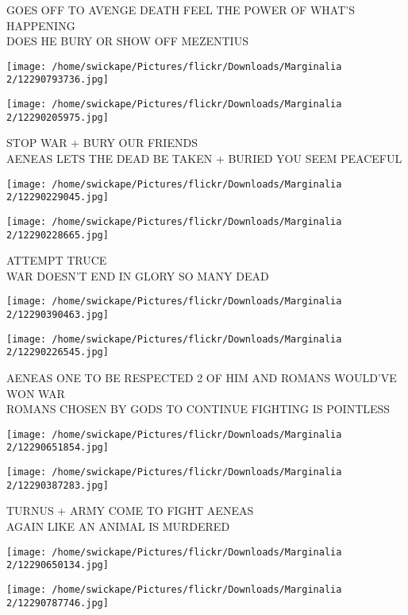 \documentclass[10pt,letterpaper]{article}
\begin{document}
GOES OFF TO AVENGE DEATH FEEL THE POWER OF WHAT'S HAPPENING\\
DOES HE BURY OR SHOW OFF MEZENTIUS
\pagebreak

\texttt{[image: /home/swickape/Pictures/flickr/Downloads/Marginalia 2/12290793736.jpg]}

\vspace{0.25in}
\texttt{[image: /home/swickape/Pictures/flickr/Downloads/Marginalia 2/12290205975.jpg]}

STOP WAR + BURY OUR FRIENDS\\
AENEAS LETS THE DEAD BE TAKEN + BURIED YOU SEEM PEACEFUL
\pagebreak

\texttt{[image: /home/swickape/Pictures/flickr/Downloads/Marginalia 2/12290229045.jpg]}

\vspace{0.25in}
\texttt{[image: /home/swickape/Pictures/flickr/Downloads/Marginalia 2/12290228665.jpg]}

ATTEMPT TRUCE\\
WAR DOESN'T END IN GLORY SO MANY DEAD
\pagebreak

\texttt{[image: /home/swickape/Pictures/flickr/Downloads/Marginalia 2/12290390463.jpg]}

\vspace{0.25in}
\texttt{[image: /home/swickape/Pictures/flickr/Downloads/Marginalia 2/12290226545.jpg]}

AENEAS ONE TO BE RESPECTED 2 OF HIM AND ROMANS WOULD'VE WON WAR\\
ROMANS CHOSEN BY GODS TO CONTINUE FIGHTING IS POINTLESS
\pagebreak

\texttt{[image: /home/swickape/Pictures/flickr/Downloads/Marginalia 2/12290651854.jpg]}

\vspace{0.25in}
\texttt{[image: /home/swickape/Pictures/flickr/Downloads/Marginalia 2/12290387283.jpg]}

TURNUS + ARMY COME TO FIGHT AENEAS\\
AGAIN LIKE AN ANIMAL IS MURDERED
\pagebreak

\texttt{[image: /home/swickape/Pictures/flickr/Downloads/Marginalia 2/12290650134.jpg]}

\vspace{0.25in}
\texttt{[image: /home/swickape/Pictures/flickr/Downloads/Marginalia 2/12290787746.jpg]}
\end{document}
